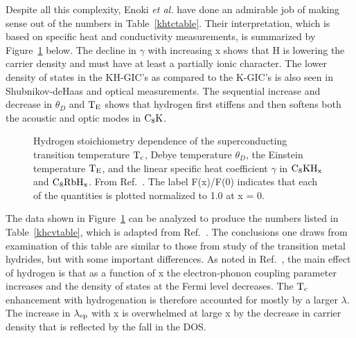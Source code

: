         Despite  all this complexity,  Enoki  {\em et  al.\/} have  done an
admirable job of making sense out of  the numbers in Table~\ref{khtctable}.
Their  interpretation,  which is based  on specific  heat  and conductivity
measurements, is summarized  by Figure~\ref{khC_v} below.    The decline in
$\gamma$ with increasing x shows that H is lowering the carrier density and
must have at   least a partially ionic  character.   The lower density   of
states  in the  KH-GIC's  as  compared  to the   K-GIC's is   also  seen in
Shubnikov-deHaas\cite{Z260}  and   optical   measurements.\cite{doll87} The
sequential increase  and decrease in  $\theta_D$ and  $\rm  T_E$ shows that
hydrogen first stiffens and then softens both the  acoustic and optic modes
in $\rm C_8K$.

\begin{figure}
\vspace{17cm}
\caption[Hydrogen stoichiometry dependence of thermodynamic quantities in
$\rm C_8KH_x$ and $\rm C_8RbH_x$]{Hydrogen stoichiometry dependence  of the
superconducting    transition temperature $\rm     T_c$,  Debye temperature
$\theta_D$, the Einstein  temperature $\rm   T_E$, and the linear  specific
heat coefficient $\gamma$   in $\rm C_8KH_x$  and $\rm  C_8RbH_x$.     From
Ref.~\cite{enoki85}.   The  label F(x)/F(0) indicates  that  each  of   the
quantities is plotted normalized to 1.0 at x = 0.}
\label{khC_v}
\end{figure}

        The data shown in Figure~\ref{khC_v} can be analyzed to produce the
numbers    listed   in  Table~\ref{khcvtable},  which   is   adapted   from
Ref.~\cite{enoki85}.  The  conclusions one draws  from  examination of this
table are similar to those from study of the transition metal hydrides, but
with some important differences.  As noted in Ref.~\cite{enoki85}, the main
effect of hydrogen is that as a function of x  the electron-phonon coupling
parameter increases and the density of states at the Fermi level decreases.
The $\rm  T_c$  enhancement with hydrogenation  is  therefore accounted for
mostly  by a   larger $\lambda$.   The   increase  in $\rm \lambda_{ep}$ with x   is
overwhelmed at large x by the decrease in carrier density that is reflected
by the fall in the DOS.


